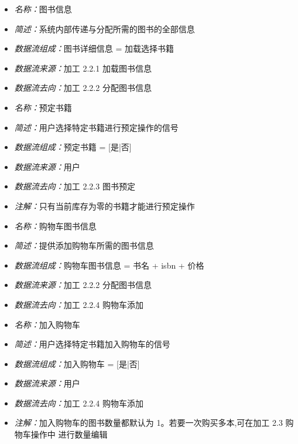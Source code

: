 \vspace{-1mm}

\begin{itemize}
	\item \textit{名称：}图书信息
	\item \textit{简述：}系统内部传递与分配所需的图书的全部信息
	\item \textit{数据流组成：}图书详细信息 = 加载选择书籍
	\item \textit{数据流来源：}加工 2.2.1 加载图书信息
	\item \textit{数据流去向：}加工 2.2.2 分配图书信息
\end{itemize}

\vspace{-1mm}

\begin{itemize}
	\item \textit{名称：}预定书籍
	\item \textit{简述：}用户选择特定书籍进行预定操作的信号
	\item \textit{数据流组成：}预定书籍 = [是|否]
	\item \textit{数据流来源：}用户
	\item \textit{数据流去向：}加工 2.2.3 图书预定
	\item \textit{注解：}只有当前库存为零的书籍才能进行预定操作
\end{itemize}

\vspace{-1mm}

\begin{itemize}
	\item \textit{名称：}购物车图书信息
	\item \textit{简述：}提供添加购物车所需的图书信息
	\item \textit{数据流组成：}购物车图书信息  = 书名 + isbn + 价格
	\item \textit{数据流来源：}加工 2.2.2 分配图书信息
	\item \textit{数据流去向：}加工 2.2.4 购物车添加
\end{itemize}

\vspace{-1mm}

\begin{itemize}
	\item \textit{名称：}加入购物车
	\item \textit{简述：}用户选择特定书籍加入购物车的信号
	\item \textit{数据流组成：}加入购物车 = [是|否]
	\item \textit{数据流来源：}用户
	\item \textit{数据流去向：}加工 2.2.4 购物车添加
	\item \textit{注解：}加入购物车的图书数量都默认为 1。若要一次购买多本,可在加工 2.3 购物车操作中	进行数量编辑
\end{itemize}

